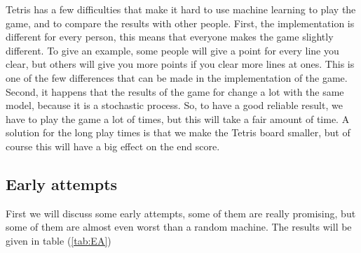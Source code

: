 \documentclass{report}
\begin{document}
Tetris has a few difficulties that make it hard to use machine learning to play the game, and to compare the results with other people. First, the implementation is different for every person, this means that everyone makes the game slightly different. To give an example, some people will give a point for every line you clear, but others will give you more points if you clear more lines at ones. This is one of the few differences that can be made in the implementation of the game. Second, it happens that the results of the game for change a lot with the same model, because it is a stochastic process. So, to have a good reliable result, we have to play the game a lot of times, but this will take a fair amount of time. A solution for the long play times is that we make the Tetris board smaller, but of course this will have a big effect on the end score.

\subsection{Early attempts}
First we will discuss some early attempts, some of them are really promising, but some of them are almost even worst than a random machine. The results will be given in table (\ref{tab:EA})
\end{document}
